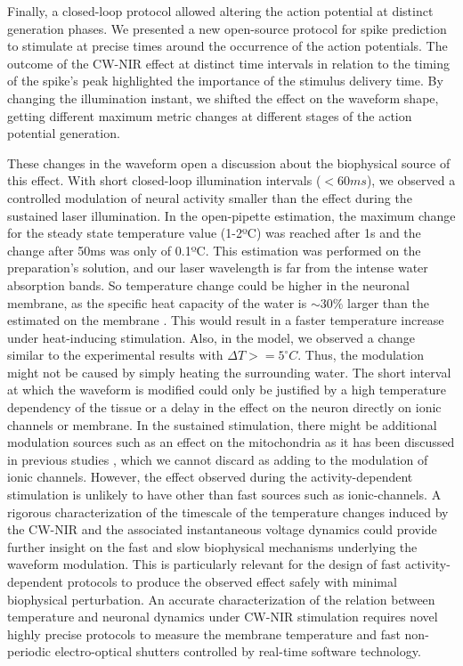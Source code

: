 Finally, a closed-loop protocol allowed altering the action potential at distinct generation phases. We presented a new open-source protocol for spike prediction to stimulate at precise times around the occurrence of the action potentials. The outcome of the CW-NIR effect at distinct time intervals in relation to the timing of the spike's peak highlighted the importance of the stimulus delivery time. By changing the illumination instant, we shifted the effect on the waveform shape, getting different maximum metric changes at different stages of the action potential generation.

These changes in the waveform open a discussion about the biophysical source of this effect. With short closed-loop illumination intervals ($<60ms$), we observed a controlled modulation of neural activity smaller than the effect during the sustained laser illumination. In the open-pipette estimation, the maximum change for the steady state temperature value (1-2ºC) was reached after 1s and the change after 50ms was only of 0.1ºC. This estimation was performed on the preparation's solution, and our laser wavelength is far from the intense water absorption bands. So temperature change could be higher in the neuronal membrane, as the specific heat capacity of the water is $\sim30\%$ larger than the estimated on the membrane \parencite{thompson_modeling_2012}. This would result in a faster temperature increase under heat-inducing stimulation. Also, in the model, we observed a change similar to the experimental results with $\Delta T>=5^{\circ}C$. Thus, the modulation might not be caused by simply heating the surrounding water. The short interval at which the waveform is modified could only be justified by a high temperature dependency of the tissue or a delay in the effect on the neuron directly on ionic channels or membrane. In the sustained stimulation, there might be additional modulation sources such as an effect on the mitochondria as it has been discussed in previous studies \parencite{dittami_intracellular_2011, lumbreras_pulsed_2014, saucedo_transcranial_2021}, which we cannot discard as adding to the modulation of ionic channels. However, the effect observed during the activity-dependent stimulation is unlikely to have other than fast sources such as ionic-channels. 
A rigorous characterization of the timescale of the temperature changes induced by the CW-NIR and the associated instantaneous voltage dynamics could provide further insight on the fast and slow biophysical mechanisms underlying the waveform modulation. This is particularly relevant for the design of fast activity-dependent protocols to produce the observed effect safely with minimal biophysical perturbation. An accurate characterization of the relation between temperature and neuronal dynamics under CW-NIR stimulation requires novel highly precise protocols to measure the membrane temperature and fast non-periodic electro-optical shutters controlled by real-time software technology.

